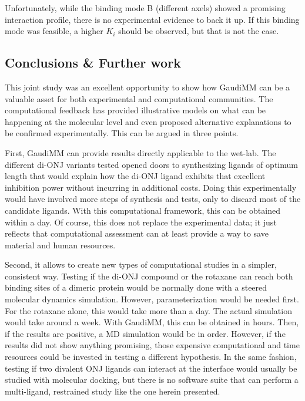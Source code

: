 Unfortunately, while the binding mode B (different axels) showed a promising interaction profile, there is no experimental evidence to back it up. If this binding mode was feasible, a higher $K_{i}$ should be observed, but that is not the case.

\subsection{Conclusions \& Further work}
This joint study was an excellent opportunity to show how GaudiMM can be a valuable asset for both experimental and computational communities. The computational feedback has provided illustrative models on what can be happening at the molecular level and even proposed alternative explanations to be confirmed experimentally. This can be argued in three points.

First, GaudiMM can provide results directly applicable to the wet-lab. The different di-ONJ variants tested opened doors to synthesizing ligands of optimum length that would explain how the di-ONJ ligand exhibits that excellent inhibition power without incurring in additional costs. Doing this experimentally would have involved more steps of synthesis and tests, only to discard most of the candidate ligands. With this computational framework, this can be obtained within a day. Of course, this does not replace the experimental data; it just reflects that computational assessment can at least provide a way to save material and human resources.

Second, it allows to create new types of computational studies in a simpler, consistent way. Testing if the di-ONJ compound or the rotaxane can reach both binding sites of a dimeric protein would be normally done with a steered molecular dynamics simulation. However, parameterization would be needed first. For the rotaxane alone, this would take more than a day. The actual simulation would take around a week. With GaudiMM, this can be obtained in hours. Then, if the results are positive, a MD simulation would be in order. However, if the results did not show anything promising, those expensive computational and time resources could be invested in testing a different hypothesis. In the same fashion, testing if two divalent ONJ ligands can interact at the interface would usually be studied with molecular docking, but there is no software suite that can perform a multi-ligand, restrained study like the one herein presented.

